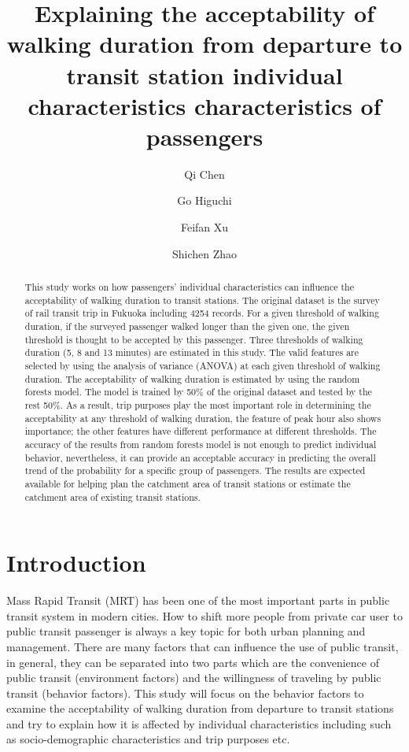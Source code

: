 \documentclass[Journal,letterpaper]{ascelike-new}
\begin{document}
\title{Explaining the acceptability of walking duration from departure to transit station individual characteristics characteristics of passengers}
%
\author[1]{Qi Chen}
\author[2]{Go Higuchi}
\author[1]{Feifan Xu}
\author[3]{Shichen Zhao}
%
%
\maketitle

\begin{abstract}
This study works on how passengers' individual characteristics can influence the acceptability of walking duration to transit stations. The original dataset is the survey of rail transit trip in Fukuoka including 4254 records. For a given threshold of walking duration, if the surveyed passenger walked longer than the given one, the given threshold is thought to be accepted by this passenger. Three thresholds of walking duration (5, 8 and 13 minutes) are estimated in this study. The valid features are selected by using the analysis of variance (ANOVA) at each given threshold of walking duration. The acceptability of walking duration is estimated by using the random forests model. The model is trained by 50\% of the original dataset and tested by the rest 50\%. As a result, trip purposes play the most important role in determining the acceptability at any threshold of walking duration, the feature of peak hour also shows importance; the other features have different performance at different thresholds. The accuracy of the results from random forests model is not enough to predict individual behavior, nevertheless, it can provide an acceptable accuracy in predicting the overall trend of the probability for a specific group of passengers. The results are expected available for helping plan the catchment area of transit stations or estimate the catchment area of existing transit stations.
\end{abstract}

%
\section{Introduction}
Mass Rapid Transit (MRT) has been one of the most important parts in public transit system in modern cities. How to shift more people from private car user to public transit passenger is always a key topic for both urban planning and management. There are many factors that can influence the use of public transit, in general, they can be separated into two parts which are the convenience of public transit (environment factors) and the willingness of traveling by public transit (behavior factors). This study will focus on the behavior factors to examine the acceptability of walking duration from departure to transit stations and try to explain how it is affected by individual characteristics including such as socio-demographic characteristics and trip purposes etc.
\end{document}
